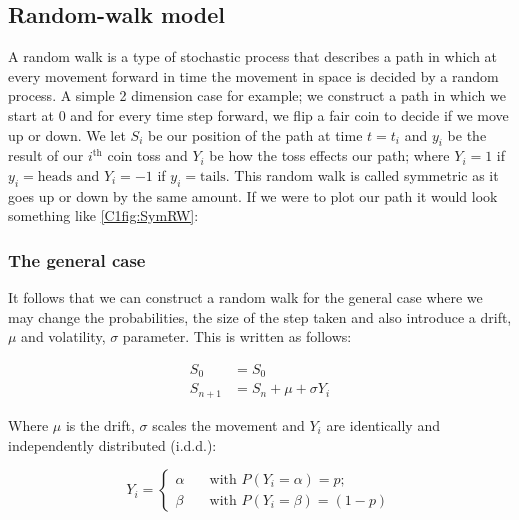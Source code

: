 \subsection{Random-walk model}\label{subsec: RW model}

A random walk is a type of stochastic process that describes a path in which at every movement forward in time the movement in space is decided by a random process. A simple 2 dimension case for example; we construct a path in which we start at 0 and for every time step forward, we flip a fair coin to decide if we move up or down. We let \( S_i \) be our position of the path at time \( t = t_i \) and \(y_i\) be the result of our \( i^\text{th} \) coin toss and \( Y_i \) be how the toss effects our path; where \( Y_i = 1 \) if \( y_i = \text{heads} \) and \(Y_i = -1\) if \( y_i = \text{tails} \). This random walk is called symmetric as it goes up or down by the same amount. If we were to plot our path it would look something like \autoref{C1fig:SymRW}:

\subsubsection{The general case}

It follows that we can construct a random walk for the general case where we may change the probabilities, the size of the step taken and also introduce a drift, \(\mu \) and volatility, \(\sigma \) parameter. This is written as follows:

\begin{align*}
    S_0 &= S_0 \\
    S_{n+1} &= S_{n} + \mu + \sigma Y_i
\end{align*}

Where \(\mu \) is the drift, \(\sigma \) scales the movement and \(Y_i\) are identically and independently distributed (i.d.d.):

\begin{equation*}
    Y_i = 
    \begin{cases}
       \alpha& \quad \text{with } P(Y_i = \alpha) = p; \\
       \beta& \quad \text{with } P(Y_i = \beta) = (1-p)
    \end{cases}
\end{equation*}

